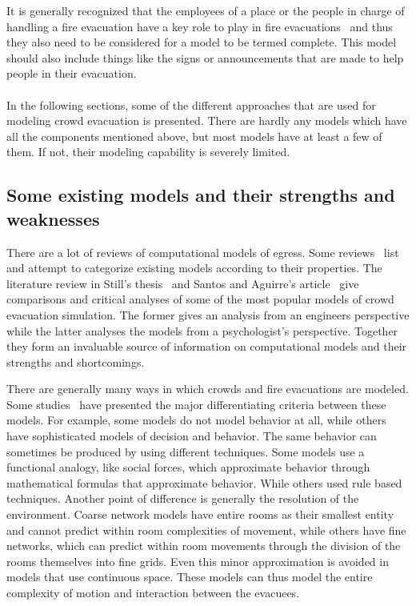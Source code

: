 It is generally recognized that the employees of a place or the people in charge of handling a fire evacuation have a key role to play in fire evacuations~\cite{Paulsen:1984ti,Aguirre:2004tn,Andree:2008td,Proulx:2001we} and thus they also need to be considered for a model to be termed complete. This model should also include things like the signs or announcements that are made to help people in their evacuation.\\
\\


In the following sections, some of the different approaches that are used for modeling crowd evacuation is presented. There are hardly any models which have all the components mentioned above, but most models have at least a few of them. If not, their modeling capability is severely limited.

\subsection{Some existing models and their strengths and weaknesses}
\label{LiteratureReview:ExistingModelsSummary}
There are a lot of reviews of computational models of egress. Some reviews~\cite{WattsJr:1987tx,Gwynne:1999vi,Kuligowski:2005tt,Schadschneider:2008cz,Zheng:2009id} list and attempt to categorize existing models according to their properties. The literature review in Still's thesis~\cite{Still:2000tp} and Santos and Aguirre's article~\cite{Aguirre:2004tn} give comparisons and critical analyses of some of the most popular models of crowd evacuation simulation. The former gives an analysis from an engineers perspective while the latter analyses the models from a psychologist's perspective. Together they form an invaluable source of information on computational models and their strengths and shortcomings.

There are generally many ways in which crowds and fire evacuations are modeled. Some studies~\cite{Gwynne:1999vi,Kuligowski:2005tt} have presented the major differentiating criteria between these models. For example, some models do not model behavior at all, while others have sophisticated models of decision and behavior. The same behavior can sometimes be produced by using different techniques. Some models use a functional analogy, like social forces, which approximate behavior through mathematical formulas that approximate behavior. While others used rule based techniques. Another point of difference is generally the resolution of the environment. Coarse network models have entire rooms as their smallest entity and cannot predict within room complexities of movement, while others have fine networks, which can predict within room movements through the division of the rooms themselves into fine grids. Even this minor approximation is avoided in models that use continuous space. These models can thus model the entire complexity of motion and interaction between the evacuees.

